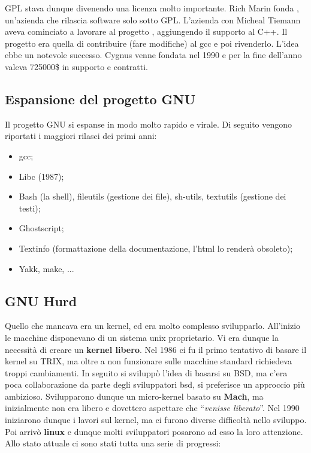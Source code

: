 GPL stava dunque divenendo una licenza molto importante. Rich Marin fonda , un'azienda che rilascia software solo sotto GPL. L'azienda  con Micheal Tiemann aveva cominciato a lavorare al progetto , aggiungendo il supporto al C++. Il progetto era quella di contribuire (fare modifiche) al gcc e poi rivenderlo. L'idea ebbe un notevole successo. Cygnus venne fondata nel 1990 e per la fine dell'anno valeva 725000\$ in supporto e contratti.

\subsection{Espansione del progetto GNU}

Il progetto GNU si espanse in modo molto rapido e virale. Di seguito vengono riportati i maggiori rilasci dei primi anni:

\begin{itemize}
	
	\item gcc;
	\item Libc (1987);
	\item Bash (la shell), fileutils (gestione dei file), sh-utils, textutils (gestione dei testi);
	\item Ghostscript;
	\item Textinfo (formattazione della documentazione, l'html lo renderà obsoleto);
	\item Yakk, make, ...
	
\end{itemize}

\subsection{GNU Hurd}

Quello che mancava era un kernel, ed era molto complesso svilupparlo. All'inizio le macchine disponevano di un sistema unix proprietario. Vi era dunque la necessità di creare un \textbf{kernel libero}. Nel 1986 ci fu il primo tentativo di basare il kernel su TRIX, ma oltre a non funzionare sulle macchine standard richiedeva troppi cambiamenti. In seguito si sviluppò l'idea di basarsi su BSD, ma c'era poca collaborazione da parte degli sviluppatori bsd, si preferisce un approccio più ambizioso.
Svilupparono dunque un micro-kernel basato su \textbf{Mach}, ma inizialmente non era libero e dovettero aspettare che ``\textit{venisse liberato}''. Nel 1990 iniziarono dunque i lavori sul kernel, ma ci furono diverse difficoltà nello sviluppo. Poi arrivò \textbf{linux} e dunque molti sviluppatori posarono ad esso la loro attenzione. Allo stato attuale ci sono stati tutta una serie di progressi:

